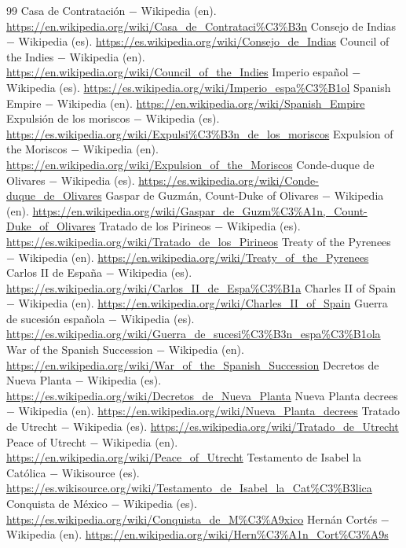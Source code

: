 \documentclass{book}
\begin{document}
\begin{thebibliography}{99}
 Casa de Contratación \(-\) Wikipedia (en). \url{https://en.wikipedia.org/wiki/Casa_de_Contrataci%C3%B3n}
 Consejo de Indias \(-\) Wikipedia (es). \url{https://es.wikipedia.org/wiki/Consejo_de_Indias}
 Council of the Indies \(-\) Wikipedia (en). \url{https://en.wikipedia.org/wiki/Council_of_the_Indies}
 Imperio español \(-\) Wikipedia (es). \url{https://es.wikipedia.org/wiki/Imperio_espa%C3%B1ol}
 Spanish Empire \(-\) Wikipedia (en). \url{https://en.wikipedia.org/wiki/Spanish_Empire}
 Expulsión de los moriscos \(-\) Wikipedia (es). \url{https://es.wikipedia.org/wiki/Expulsi%C3%B3n_de_los_moriscos}
 Expulsion of the Moriscos \(-\) Wikipedia (en). \url{https://en.wikipedia.org/wiki/Expulsion_of_the_Moriscos}
 Conde-duque de Olivares \(-\) Wikipedia (es). \url{https://es.wikipedia.org/wiki/Conde-duque_de_Olivares}
 Gaspar de Guzmán, Count-Duke of Olivares \(-\) Wikipedia (en). \url{https://en.wikipedia.org/wiki/Gaspar_de_Guzm%C3%A1n,_Count-Duke_of_Olivares}
 Tratado de los Pirineos \(-\) Wikipedia (es). \url{https://es.wikipedia.org/wiki/Tratado_de_los_Pirineos}
 Treaty of the Pyrenees \(-\) Wikipedia (en). \url{https://en.wikipedia.org/wiki/Treaty_of_the_Pyrenees}
 Carlos II de España \(-\) Wikipedia (es). \url{https://es.wikipedia.org/wiki/Carlos_II_de_Espa%C3%B1a}
 Charles II of Spain \(-\) Wikipedia (en). \url{https://en.wikipedia.org/wiki/Charles_II_of_Spain}
 Guerra de sucesión española \(-\) Wikipedia (es). \url{https://es.wikipedia.org/wiki/Guerra_de_sucesi%C3%B3n_espa%C3%B1ola}
 War of the Spanish Succession \(-\) Wikipedia (en). \url{https://en.wikipedia.org/wiki/War_of_the_Spanish_Succession}
 Decretos de Nueva Planta \(-\) Wikipedia (es). \url{https://es.wikipedia.org/wiki/Decretos_de_Nueva_Planta}
 Nueva Planta decrees \(-\) Wikipedia (en). \url{https://en.wikipedia.org/wiki/Nueva_Planta_decrees}
 Tratado de Utrecht \(-\) Wikipedia (es). \url{https://es.wikipedia.org/wiki/Tratado_de_Utrecht}
 Peace of Utrecht \(-\) Wikipedia (en). \url{https://en.wikipedia.org/wiki/Peace_of_Utrecht}
 Testamento de Isabel la Católica \(-\) Wikisource (es). \url{https://es.wikisource.org/wiki/Testamento_de_Isabel_la_Cat%C3%B3lica}
 Conquista de México \(-\) Wikipedia (es). \url{https://es.wikipedia.org/wiki/Conquista_de_M%C3%A9xico}
 Hernán Cortés \(-\) Wikipedia (en). \url{https://en.wikipedia.org/wiki/Hern%C3%A1n_Cort%C3%A9s}

\end{thebibliography}
\end{document}
